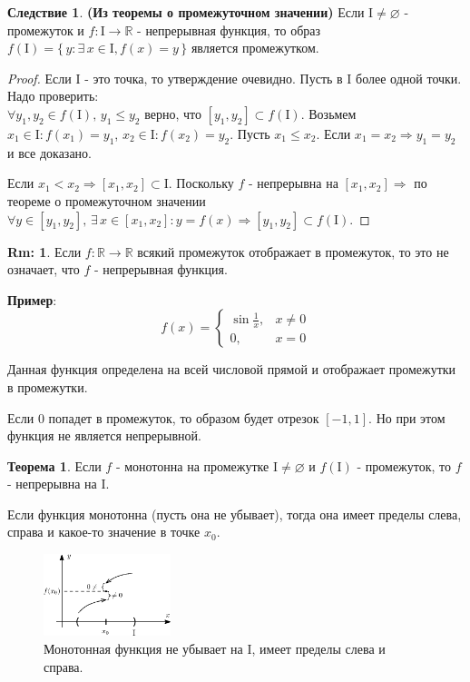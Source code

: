 \documentclass[12pt]{article}
\newcommand{\MR}{\mathbb{R}}
\newcommand{\MI}{\mathrm{I}}
\newcommand{\VN}{\varnothing}
\theoremstyle{definition}
\newtheorem{rem}{Rm:}
\newtheorem{theorem}{Теорема}
\newtheorem{corollary}{Следствие}
\begin{document}
\begin{corollary}\textbf{(Из теоремы о промежуточном значении)}
	Если $\MI \neq \VN$ - промежуток и $f \colon \MI \to \MR$ - непрерывная функция, то образ $f(\MI) = \{\, y \colon \exists \, x \in \MI, f(x) = y \,\}$ является промежутком.
\end{corollary}

\begin{proof}
	Если $\MI$ - это точка, то утверждение очевидно. Пусть в $\MI$ более одной точки. Надо проверить: \\
	$\forall y_1, y_2 \in f(\MI), \, y_1 \leq y_2$ верно, что $[y_1, y_2] \subset f(\MI)$. 
	Возьмем $x_1 \in \MI \colon f(x_1) = y_1$, $x_2 \in \MI \colon f(x_2) = y_2$. Пусть $x_1 \leq x_2$. Если $x_1 = x_2 \Rightarrow y_1 = y_2$ и все доказано. 
	
	Если $x_1 < x_2 \Rightarrow [x_1, x_2] \subset \MI$. Поскольку $f$ - непрерывна на $[x_1, x_2] \Rightarrow$ по теореме о промежуточном значении $\forall y \in [y_1, y_2], \, \exists \, x \in [x_1, x_2] \colon y = f(x) \Rightarrow [y_1, y_2] \subset f(\MI)$.
\end{proof}

\begin{rem}
	Если $f\colon \MR \to \MR$ всякий промежуток отображает в промежуток, то это не означает, что $f$ - непрерывная функция. 
\end{rem}

\textbf{Пример}: $$ f(x) = \begin{cases} 
	\sin{\frac{1}{x}}, & x \neq 0\\
	0, & x = 0
\end{cases}
$$

Данная функция определена на всей числовой прямой и отображает промежутки в промежутки. 

Если $0$ попадет в промежуток, то образом будет отрезок $[-1,1]$. Но при этом функция не является непрерывной.

\newpage 

\begin{theorem}
	Если $f$ - монотонна на промежутке $\MI \neq \VN$ и $f(\MI)$ - промежуток, то $f$ - непрерывна на $\MI$.
\end{theorem}

Если функция монотонна (пусть она не убывает), тогда она имеет пределы слева, справа и какое-то значение в точке $x_0$.
\begin{figure}[H]
	\centering
	\includegraphics[width=0.33\textwidth]{19_1.eps}
	\caption{Монотонная функция не убывает на $\MI$, имеет пределы слева и справа.}
	\label{19_1}
\end{figure}
\end{document}
